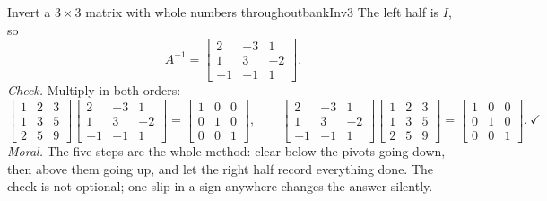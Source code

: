\documentclass[11pt]{article}
\begin{document}
\begin{exmp}{Invert a $3\times3$ matrix with whole numbers throughout}{bankInv3}
The left half is $I$, so
\[
A^{-1}=\begin{bmatrix}2&-3&1\\1&3&-2\\-1&-1&1\end{bmatrix}.
\]
\emph{Check.} Multiply in both orders:
\[
\begin{bmatrix}1&2&3\\1&3&5\\2&5&9\end{bmatrix}\begin{bmatrix}2&-3&1\\1&3&-2\\-1&-1&1\end{bmatrix}=\begin{bmatrix}1&0&0\\0&1&0\\0&0&1\end{bmatrix},\qquad
\begin{bmatrix}2&-3&1\\1&3&-2\\-1&-1&1\end{bmatrix}\begin{bmatrix}1&2&3\\1&3&5\\2&5&9\end{bmatrix}=\begin{bmatrix}1&0&0\\0&1&0\\0&0&1\end{bmatrix}.\ \checkmark
\]
\emph{Moral.} The five steps are the whole method: clear below the pivots going down, then above them going up, and let the right half record everything done. The check is not optional; one slip in a sign anywhere changes the answer silently.
\end{exmp}
\end{document}
